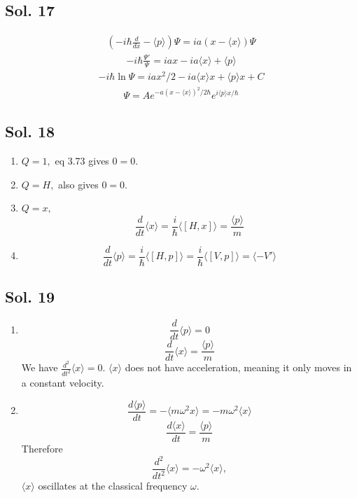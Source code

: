 \subsection*{Sol. 17}
\begin{align*}
    \left(-i\hbar\frac{d}{dx}-\langle p\rangle\right) \Psi 
    =ia(x-\langle x\rangle)\Psi
\end{align*}
\begin{align*}
    -i\hbar\frac{\Psi'}{\Psi}
    =
    iax-ia\langle x\rangle+\langle p\rangle
\end{align*}
\begin{align*}
    -i\hbar\ln\Psi = ia x^2/2-ia\langle x\rangle x + \langle p \rangle x + C
\end{align*}
\begin{align*}
    \Psi = Ae^{{-a(x-\langle x\rangle)^2}/2\hbar}e^{i\langle p\rangle x/\hbar}
\end{align*}

\subsection*{Sol. 18}
\begin{enumerate}
    \item $Q=1,$ eq 3.73 gives $0=0.$
    \item $Q=H,$ also gives $0=0.$
    \item $Q=x,$
    $$
    \frac{d}{dt}\langle x\rangle
    =\frac{i}{\hbar}
    \langle[H,x]\rangle
    =\frac{\langle p\rangle}{m}$$
    \item 
    $$
    \frac{d}{dt}\langle p\rangle
    =\frac{i}{\hbar}
    \langle[H,p]\rangle
    =\frac{i}{\hbar}\langle[V,p]\rangle
    =\langle 
    -V'\rangle
    $$
\end{enumerate}

\subsection*{Sol. 19}
\begin{enumerate}
    \item 
    $$
    \frac{d}{dt}\langle p\rangle=0
    $$
    $$
    \frac{d}{dt}\langle x\rangle=\frac{\langle p\rangle}{m}
    $$
    We have $\frac{d^2}{dt^2}\langle x\rangle=0.$ $\langle x\rangle$ does not have acceleration, meaning it only moves in a constant velocity.
    
    \item 
    $$
    \frac{d\langle p\rangle}{dt}=-\langle m\omega^2x\rangle
    = -m\omega^2\langle x\rangle
    $$
    $$
    \frac{d\langle x\rangle}{dt} = \frac{\langle p\rangle}{m}
    $$
    Therefore
    $$
    \frac{d^2}{dt^2}\langle x\rangle = -\omega^2\langle x\rangle,
    $$
    $\langle x\rangle$ oscillates at the classical frequency $\omega.$
\end{enumerate}


